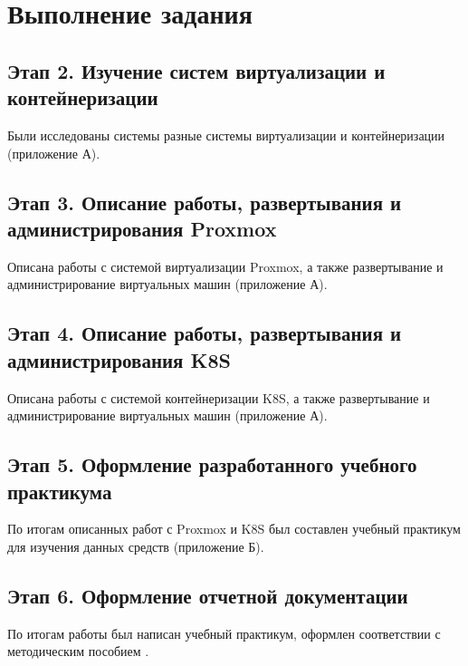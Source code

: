 \section{Выполнение задания}

\subsection{Этап 2. Изучение систем виртуализации и контейнеризации}
Были исследованы системы разные системы виртуализации и контейнеризации (приложение А).

\subsection{Этап 3. Описание работы, развертывания и администрирования Proxmox}
Описана работы с системой виртуализации Proxmox, а также развертывание и администрирование виртуальных машин (приложение А).

\subsection{Этап 4. Описание работы, развертывания и администрирования K8S}
Описана работы с системой контейнеризации K8S, а также развертывание и администрирование виртуальных машин (приложение А).

\subsection{Этап 5. Оформление разработанного учебного практикума}
По итогам описанных работ с Proxmox и K8S был составлен учебный практикум для изучения данных средств (приложение Б).

\subsection{Этап 6. Оформление отчетной документации}
По итогам работы был написан  учебный практикум, оформлен соответствии с методическим пособием \cite{markina}.


\clearpage

